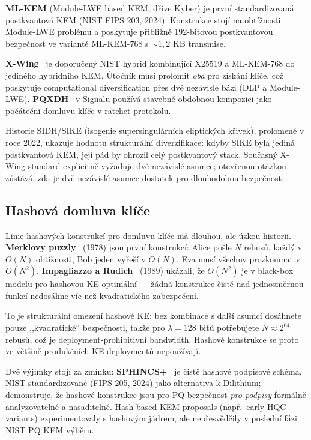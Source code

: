 \documentclass[11pt,a4paper]{article}
\begin{document}
\textbf{ML-KEM} (Module-LWE based KEM, dříve Kyber) je první standardizovaná postkvantová KEM (NIST FIPS 203, 2024). Konstrukce stojí na obtížnosti Module-LWE problému a poskytuje přibližně 192-bitovou postkvantovou bezpečnost ve variantě ML-KEM-768 s $\sim 1{,}2$ KB transmise.

\textbf{X-Wing}~\cite{xwing} je doporučený NIST hybrid kombinující X25519 a ML-KEM-768 do jediného hybridního KEM. Útočník musí prolomit \emph{oba} pro získání klíče, což poskytuje computational diversification přes dvě nezávislé bázi (DLP a Module-LWE). \textbf{PQXDH}~\cite{PQXDH} v Signalu používá stavebně obdobnou kompozici jako počáteční domluvu klíče v ratchet protokolu.

Historie SIDH/SIKE (isogenie supersingulárních eliptických křivek), prolomené v roce 2022, ukazuje hodnotu strukturální diverzifikace: kdyby SIKE byla jediná postkvantová KEM, její pád by ohrozil celý postkvantový stack. Současný X-Wing standard explicitně vyžaduje dvě nezávislé asumce; otevřenou otázkou zůstává, zda je dvě nezávislé asumce dostatek pro dlouhodobou bezpečnost.

\subsection{Hashová domluva klíče}\label{sec:related-hash}

Linie hashových konstrukcí pro domluvu klíče má dlouhou, ale úzkou historii. \textbf{Merklovy puzzly}~\cite{Merkle1978} (1978) jsou první konstrukcí: Alice pošle $N$ rebusů, každý v $O(N)$ obtížnosti, Bob jeden vyřeší v $O(N)$, Eva musí všechny prozkoumat v $O(N^2)$. \textbf{Impagliazzo a Rudich}~\cite{IR1989} (1989) ukázali, že $O(N^2)$ je v black-box modelu pro hashovou KE optimální --- žádná konstrukce čistě nad jednosměrnou funkcí nedosáhne víc než kvadratického zabezpečení.

To je strukturální omezení hashové KE: bez kombinace s další asumcí dosáhnete pouze ,,kvadratické`` bezpečnosti, takže pro $\lambda = 128$ bitů potřebujete $N \approx 2^{64}$ rebusů, což je deployment-prohibitivní bandwidth. Hashové konstrukce se proto ve většině produkčních KE deploymentů nepoužívají.

Dvě výjimky stojí za zmínku: \textbf{SPHINCS+}~\cite{SPHINCS+} je čistě hashové podpisové schéma, NIST-standardizované (FIPS 205, 2024) jako alternativa k Dilithium; demonstruje, že hashové konstrukce jsou pro PQ-bezpečnost \emph{pro podpisy} formálně analyzovatelné a nasaditelné. Hash-based KEM proposals (např.\ early HQC variants) experimentovaly s hashovým jádrem, ale nepřesvědčily v poslední fázi NIST PQ KEM výběru.
\end{document}
